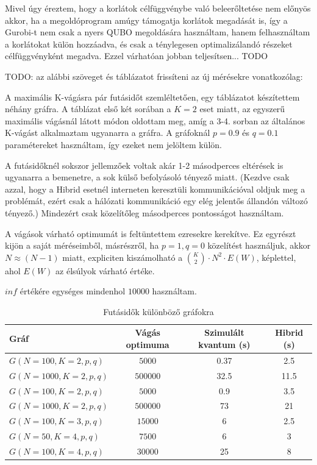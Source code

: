 Mivel úgy éreztem, hogy a korlátok célfüggvénybe való beleerőltetése nem előnyös akkor, ha a megoldóprogram amúgy támogatja korlátok megadását is, így a Gurobi-t nem csak a nyers QUBO megoldására használtam, hanem felhasználtam a korlátokat külön hozzáadva, és csak a ténylegesen optimalizálandó részeket célfüggvényként megadva. Ezzel várhatóan jobban teljesítsen... TODO


TODO: az alábbi szöveget és táblázatot 
frissíteni az új mérésekre vonatkozólag:

A maximális K-vágásra pár futásidőt szemléltetően, egy táblázatot készítettem néhány gráfra. A táblázat első két sorában a $K=2$ eset miatt, az egyszerű maximális vágásnál látott módon oldottam meg, amíg a 3-4. sorban az általános K-vágást alkalmaztam ugyanarra a gráfra. A gráfoknál $p=0.9$ és $q=0.1$ paramétereket használtam, így ezeket nem jelöltem külön.

A futásidőknél sokszor jellemzőek voltak akár 1-2 másodperces eltérések is ugyanarra a bemenetre, a sok külső befolyásoló tényező miatt. (Kezdve csak azzal, hogy a Hibrid esetnél interneten keresztüli kommunikációval oldjuk meg a problémát, ezért csak a hálózati kommunikáció egy elég jelentős állandón változó tényező.) Mindezért csak közelítőleg másodperces pontosságot használtam.

A vágások várható optimumát is feltüntettem  ezresekre kerekítve. Ez egyrészt kijön a saját méréseimből, másrészről, ha $p=1, q=0$ közelítést használjuk, akkor $N \approx (N-1)$ miatt, expliciten kiszámolható a $\binom{K}{2} \cdot N^2 \cdot E(W)$, képlettel, ahol $E(W)$ az élsúlyok várható értéke.

$inf$ értékére egységes mindenhol $10000$ használtam.

\begin{table}[ht]
	\footnotesize
	\centering
	\begin{tabular}{ l c c c }
		\toprule
		Gráf & Vágás optimuma & Szimulált kvantum (s) & Hibrid (s) \\
		\midrule
		$G(N=100, K=2, p, q)$ & $5000$ & 0.37 & 2.5   \\
		$G(N=1000, K=2, p, q)$ & $500000$ & 32.5 & 11.5 \\
		$G(N=100, K=2, p, q)$ & $5000$ & 0.9 & 3.5  \\
		$G(N=1000, K=2, p, q)$ & $500000$ & 73 & 21 \\	
		$G(N=100, K=3, p, q)$ & $15000$ & 6 & 2.5 \\		
		$G(N=50, K=4, p, q)$ & $7500$ & 6 & 3 \\		
		$G(N=100, K=4, p, q)$ & $30000$ & 25 & 8 \\

		\bottomrule
	\end{tabular}
	\caption{Futásidők különböző gráfokra}
	\label{tab:TabularExample}
\end{table}

